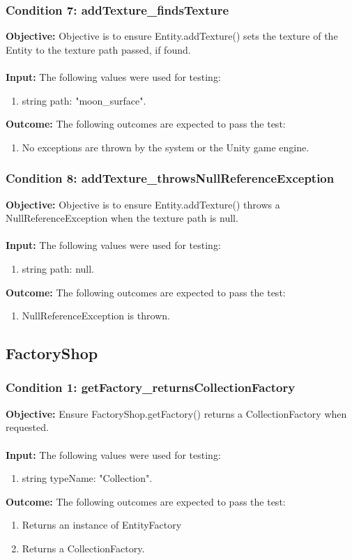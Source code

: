 \documentclass[a4paper,12pt]{article}
\begin{document}
		\subsubsection{Condition 7: addTexture\_findsTexture}
			\textbf{Objective:} Objective is to ensure Entity.addTexture() sets the texture of the Entity to the texture path passed, if found.\\\\
			\textbf{Input:} The following values were used for testing:
				\begin{enumerate}
					\item string path: "moon\_surface".
				\end{enumerate}
			\textbf{Outcome:} The following outcomes are expected to pass the test:
				\begin{enumerate}
					\item No exceptions are thrown by the system or the Unity game engine.
				\end{enumerate}
		\subsubsection{Condition 8: addTexture\_throwsNullReferenceException}
			\textbf{Objective:} Objective is to ensure Entity.addTexture() throws a NullReferenceException when the texture path is null.\\\\
			\textbf{Input:} The following values were used for testing:
				\begin{enumerate}
					\item string path: null.
				\end{enumerate}
			\textbf{Outcome:} The following outcomes are expected to pass the test:
				\begin{enumerate}
					\item NullReferenceException is thrown.
				\end{enumerate}
	\subsection{FactoryShop}
		\subsubsection{Condition 1: getFactory\_returnsCollectionFactory}
			\textbf{Objective:} Ensure FactoryShop.getFactory() returns a CollectionFactory when requested.\\\\
			\textbf{Input:} The following values were used for testing:
				\begin{enumerate}
					\item string typeName: "Collection".
				\end{enumerate}
			\textbf{Outcome:} The following outcomes are expected to pass the test:
				\begin{enumerate}
					\item Returns an instance of EntityFactory
					\item Returns a CollectionFactory.
				\end{enumerate}
\end{document}
